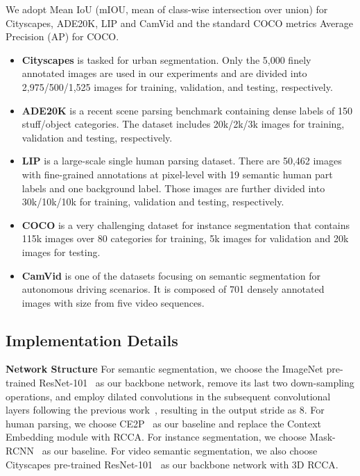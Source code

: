 \documentclass[10pt,journal,compsoc]{IEEEtran}
\begin{document}
We adopt Mean IoU (mIOU, mean of class-wise intersection over union) for Cityscapes, ADE20K, LIP and CamVid and the standard COCO metrics Average Precision (AP) for COCO.
\begin{itemize}
    \item \textbf{Cityscapes} is tasked for urban segmentation.
    Only the 5,000 finely annotated images are used in our experiments and are divided into 2,975/500/1,525 images for training, validation, and testing, respectively.
    \item \textbf{ADE20K} is a recent scene parsing benchmark containing dense labels of 150 stuff/object categories. The dataset includes 20k/2k/3k images for training, validation and testing, respectively.
    \item \textbf{LIP} is a large-scale single human parsing dataset. There are 50,462 images with fine-grained annotations at pixel-level with 19 semantic human part labels and one background label. Those images are further divided into 30k/10k/10k for training, validation and testing, respectively.
    \item \textbf{COCO} is a very challenging dataset for instance segmentation that contains 115k images over 80 categories for training, 5k images for validation and 20k images for testing.
    \item \textbf{CamVid} is one of the datasets focusing on semantic segmentation for autonomous driving scenarios. It is composed of
    701 densely annotated images with size  from five video sequences.
\end{itemize}

\subsection{Implementation Details}

\noindent\textbf{Network Structure} 
For semantic segmentation, we choose the ImageNet pre-trained ResNet-101~\cite{he2016deep} as our backbone network, remove its last two down-sampling operations, and employ dilated convolutions in the subsequent convolutional layers following the previous work~\cite{chen2014semantic}, resulting in the output stride as 8. For human parsing, we choose CE2P~\cite{ruan2019devil} as our baseline and replace the  Context Embedding module with RCCA. For instance segmentation, we choose Mask-RCNN~\cite{he2017mask} as our baseline. For video semantic segmentation, we also choose Cityscapes pre-trained ResNet-101~\cite{he2016deep} as our backbone network with 3D RCCA.
\end{document}

